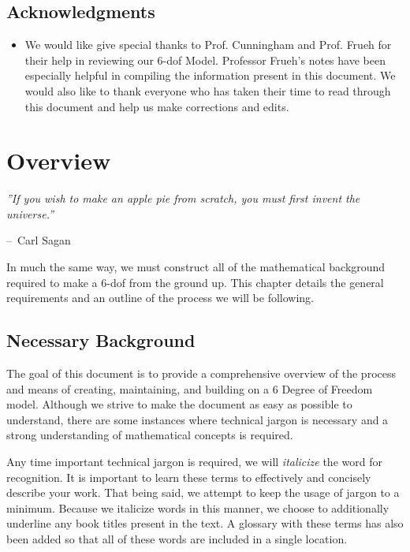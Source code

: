 \documentclass[12pt]{report}
\makeatletter
\newenvironment{chapquote}[2][2em]
  {\setlength{\@tempdima}{#1}%
   \def\chapquote@author{#2}%
   \parshape 1 \@tempdima \dimexpr\textwidth-2\@tempdima\relax%
   \itshape}
  {\par\normalfont\hfill--\ \chapquote@author\hspace*{\@tempdima}\par\bigskip}
\makeatother
\begin{document}
\section*{Acknowledgments}
\begin{itemize}
\item We would like give special thanks to Prof. Cunningham and Prof. Frueh for their help in reviewing our 6-\gls{dof} Model. Professor Frueh's notes have been especially helpful in compiling the information present in this document. We would also like to thank everyone who has taken their time to read through this document and help us make corrections and edits.

\end{itemize}

\chapter{Overview}


\begin{chapquote}{Carl Sagan}
''If you wish to make an apple pie from scratch, you must first invent the universe.''
\end{chapquote}

In much the same way, we must construct all of the mathematical background required to make a 6-\gls{dof} from the ground up. This chapter details the general requirements and an outline of the process we will be following.

\section{Necessary Background}
The goal of this document is to provide a comprehensive overview of the process and means of creating, maintaining, and building on a 6 Degree of Freedom model. Although we strive to make the document as easy as possible to understand, there are some instances where technical jargon is necessary and a strong understanding of mathematical concepts is required. 

Any time important technical jargon is required, we will \textit{italicize} the word for recognition. It is important to learn these terms to effectively and concisely describe your work. That being said, we attempt to keep the usage of jargon to a minimum. Because we italicize words in this manner, we choose to additionally underline any book titles present in the text. A glossary with these terms has also been added so that all of these words are included in a single location. 
\end{document}
